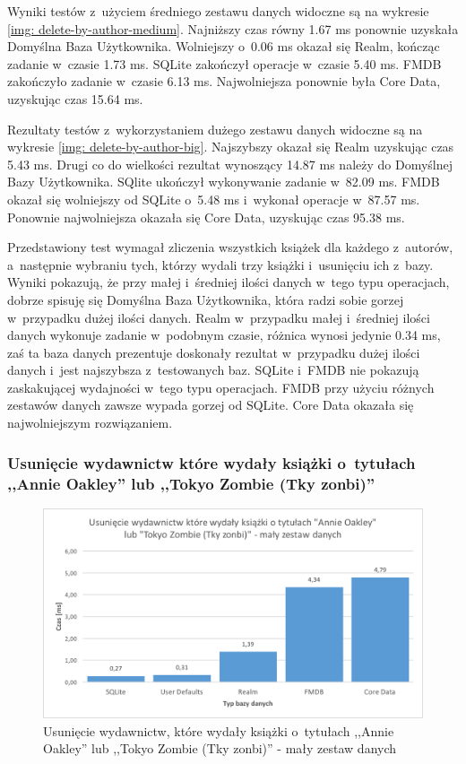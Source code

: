 Wyniki testów z~użyciem średniego zestawu danych widoczne są na wykresie \ref{img: delete-by-author-medium}. Najniższy czas równy 1.67 ms ponownie uzyskała Domyślna Baza Użytkownika. Wolniejszy o~0.06 ms okazał się Realm, kończąc zadanie w~czasie 1.73 ms. SQLite zakończył operacje w~czasie 5.40 ms. FMDB zakończyło zadanie w~czasie 6.13 ms. Najwolniejsza ponownie była Core Data, uzyskując czas 15.64 ms.

Rezultaty testów z~wykorzystaniem dużego zestawu danych widoczne są na wykresie \ref{img: delete-by-author-big}. Najszybszy okazał się Realm uzyskując czas 5.43 ms. Drugi co do wielkości rezultat wynoszący 14.87 ms należy do Domyślnej Bazy Użytkownika. SQlite ukończył wykonywanie zadanie w~82.09 ms. FMDB okazał się wolniejszy od SQLite o~5.48 ms i~wykonał operacje w~87.57 ms. Ponownie najwolniejsza okazała się Core Data, uzyskując czas 95.38 ms.

Przedstawiony test wymagał zliczenia wszystkich książek dla każdego z~autorów, a~następnie wybraniu tych, którzy wydali trzy książki i~usunięciu ich z~bazy. Wyniki pokazują, że przy małej i~średniej ilości danych w~tego typu operacjach, dobrze spisuję się Domyślna Baza Użytkownika, która radzi sobie gorzej w~przypadku dużej ilości danych. Realm w~przypadku małej i~średniej ilości danych wykonuje zadanie w~podobnym czasie, różnica wynosi jedynie 0.34 ms, zaś ta baza danych prezentuje doskonały rezultat w~przypadku dużej ilości danych i~jest najszybsza z~testowanych baz. SQLite i~FMDB nie pokazują zaskakującej wydajności w~tego typu operacjach. FMDB przy użyciu różnych zestawów danych zawsze wypada gorzej od SQLite. Core Data okazała się najwolniejszym rozwiązaniem.

\subsubsection{Usunięcie wydawnictw które wydały książki o~tytułach ,,Annie Oakley'' lub ,,Tokyo Zombie (Tky zonbi)''}

\begin{figure}[H]
    \centering\includegraphics[width=\linewidth]{img/delete_data/delete_by_publisher/delete_by_publisher_small_test.png}
    \caption{Usunięcie wydawnictw, które wydały książki o~tytułach ,,Annie Oakley'' lub ,,Tokyo Zombie (Tky zonbi)'' - mały zestaw danych}
    \label{img: delete-by-publisher-small}
\end{figure}

